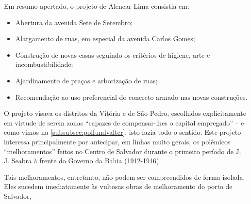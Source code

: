 Em resumo apertado, o projeto de Alencar Lima consistia em:

\begin{itemize}
\item Abertura da avenida Sete de Setembro;
\item Alargamento de ruas, em especial da avenida Carlos Gomes;
\item Construção de novas casas seguindo os critérios de higiene, arte e incombustibilidade;
\item Ajardinamento de praças e arborização de ruas;
\item Recomendação ao uso preferencial do concreto armado nas novas construções.
\end{itemize}

O projeto visava os distritos da Vitória e de São Pedro, escolhidos explicitamente em virtude de serem zonas ``capazes de compensar-lhes o capital empregado'' \cite[p.~95]{CUNHA2011} -- e como vimos na \autoref{subsubsec:polfundvalter}, isto fazia todo o sentido. Este projeto interessa principalmente por antecipar, em linhas muito gerais, os polêmicos ``melhoramentos'' feitos no Centro de Salvador durante o primeiro período de J. J. Seabra à frente do Governo da Bahia (1912-1916).

Tais melhoramentos, entretanto, não podem ser compreendidos de forma isolada. Eles sucedem imediatamente às vultosas obras de melhoramento do porto de Salvador, 